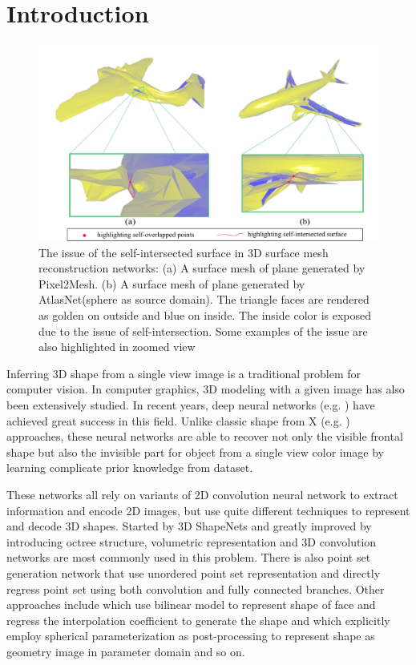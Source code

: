 \section{Introduction}
\begin{figure}[htbp]
	\centering
	\includegraphics[width=0.45\linewidth]{img/issue/issue}
	\caption{The issue of the self-intersected surface in 3D surface mesh reconstruction networks: (a) A surface mesh of plane generated by Pixel2Mesh\cite{pixel2mesh}. (b) A surface mesh of plane generated by AtlasNet\cite{atlasnet}(sphere as source domain). The triangle faces are rendered as golden on outside and blue on inside. The inside color is exposed due to the issue of self-intersection. Some examples of the issue are also highlighted in zoomed view}
	\label{fig:issue}
\end{figure}
Inferring 3D shape from a single view image is a traditional problem for computer vision. In computer graphics, 3D modeling with a given image has also been extensively studied. In recent years, deep neural networks (e.g. \cite{3DR2N2,PSGN,3Drender,imgrecon15,3dshapenet,endface,octreegen,surfnet,shapeprior}) have achieved great success in this field. Unlike classic shape from X (e.g. \cite{shapefromshading,shapefromtext1,shapefromtext2}) approaches, these neural networks are able to recover not only the visible frontal shape but also the invisible part for object from a single view color image by learning complicate prior knowledge from dataset. 

These networks all rely on variants of 2D convolution neural network to extract information and encode 2D images, but use quite different techniques to represent and decode 3D shapes. Started by 3D ShapeNets\cite{3dshapenet} and greatly improved by introducing octree structure\cite{octreegen}, volumetric representation and 3D convolution networks are most commonly used in this problem. There is also point set generation network\cite{PSGN} that use unordered point set representation and directly regress point set using both convolution and fully connected branches. Other approaches include \cite{endface} which use bilinear model to represent shape of face and regress the interpolation coefficient to generate the shape and \cite{surfnet} which explicitly employ spherical parameterization as post-processing to represent shape as geometry image in parameter domain and so on.

